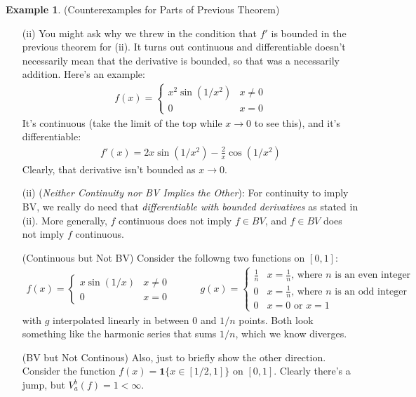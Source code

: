 \documentclass[12pt]{book}
\numberwithin{equation}{section} %
\theoremstyle{plain}
\theoremstyle{definition}
\newtheorem{ex}[thm]{Example}
\theoremstyle{remark}
\begin{document}
\begin{ex}(Counterexamples for Parts of Previous Theorem)
\begin{enumerate}[label=(\roman*)]
  \item[(ii)]
    You might ask why we threw in the condition that $f'$ is bounded in
    the previous theorem for (ii).  It turns out continuous and
    differentiable doesn't necessarily mean that the derivative is
    bounded, so that was a necessarily addition.  Here's an example:
    \begin{align*}
        f(x) =
        \begin{cases}
            x^2 \sin(1/x^2) & x \neq 0\\
            0               & x = 0
        \end{cases}
    \end{align*}
    It's continuous (take the limit of the top while $x\rightarrow 0$ to
    see this), and it's differentiable:
    \begin{align*}
      f'(x) = 2x \sin(1/x^2) - \frac{2}{x} \cos(1/x^2)
    \end{align*}
    Clearly, that derivative isn't bounded as $x\rightarrow 0$.

  \item[(ii)]
    (\emph{Neither Continuity nor BV Implies the Other}):
    For continuity to imply BV, we really do need that
    \emph{differentiable with bounded derivatives} as stated in (ii).
    More generally, $f$ continuous does not imply $f\in BV$, and $f \in
    BV$ does not imply $f$ continuous.

    (Continuous but Not BV)
    Consider the followng two functions on $[0,1]$:
    \begin{align*}
        f(x) =
            \begin{cases}
                x \sin(1/x) & x\neq 0 \\
                0 & x=0
            \end{cases}
        \qquad\quad
        g(x) =
        \begin{cases}
        \frac{1}{n} & \text{$x = \frac{1}{n}$, where $n$ is an even integer}\\
        0 & \text{$x = \frac{1}{n}$, where $n$ is an odd integer} \\
        0 & \text{$x = 0$ or $x = 1$}
        \end{cases}
    \end{align*}
    with $g$ interpolated linearly in between $0$ and $1/n$ points.
    Both look something like the harmonic series that sums $1/n$, which we
    know diverges.

    (BV but Not Continous)
    Also, just to briefly show the other direction.
    Consider the function $f(x)=\mathbf{1}\{x\in[1/2,1]\}$ on $[0,1]$.
    Clearly there's a jump, but $V_a^b(f) = 1 < \infty$.
\end{enumerate}
\end{ex}
\end{document}
